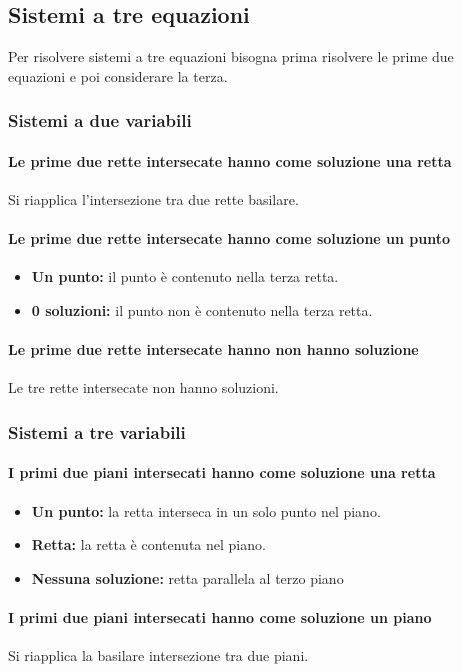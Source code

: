 \documentclass[12pt,a4paper]{article}
\begin{document}
\subsection{Sistemi a tre equazioni}
Per risolvere sistemi a tre equazioni bisogna prima risolvere le prime due equazioni e poi considerare la terza.
\subsubsection{Sistemi a due variabili}
\paragraph{Le prime due rette intersecate hanno come soluzione una retta}
Si riapplica l'intersezione tra due rette basilare.
\paragraph{Le prime due rette intersecate hanno come soluzione un punto}
\begin{itemize}
  \item \textbf{Un punto:} il punto è contenuto nella terza retta.
  \item \textbf{0 soluzioni:} il punto non è contenuto nella terza retta.
\end{itemize}
\paragraph{Le prime due rette intersecate hanno non hanno soluzione}
Le tre rette intersecate non hanno soluzioni.
\subsubsection{Sistemi a tre variabili}
\paragraph{I primi due piani intersecati hanno come soluzione una retta}
\begin{itemize}
  \item \textbf{Un punto:} la retta interseca in un solo punto nel piano.
  \item \textbf{Retta:} la retta è contenuta nel piano.
  \item \textbf{Nessuna soluzione:} retta parallela al terzo piano
\end{itemize}
\paragraph{I primi due piani intersecati hanno come soluzione un piano}
Si riapplica la basilare intersezione tra due piani.
\end{document}
